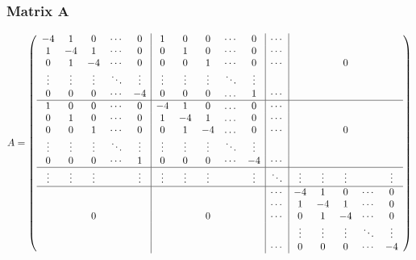 \begin{frame}
\frametitle{Matrix A}

\tiny
\[
	A=\left(
	\begin{array}{ccccc|ccccc|c|ccccc}
	    -4&     1&     0&\cdots&     0 &     1&     0&     0&\cdots&     0 &\cdots &      &      &      &      &      \\
	     1&    -4&     1&\cdots&     0 &     0&     1&     0&\cdots&     0 &\cdots &      &      &      &      &      \\
	     0&     1&    -4&\cdots&     0 &     0&     0&     1&\cdots&     0 &\cdots &      &      &     0&      &      \\
	\vdots&\vdots&\vdots&\ddots&\vdots &\vdots&\vdots&\vdots&\ddots&\vdots &       &      &      &      &      &      \\
	     0&     0&     0&\cdots&    -4 &     0&     0&     0&\dots &     1 &\cdots &      &      &      &      &      \\
	\hline
	     1&     0&     0&\cdots&     0 &    -4&     1&     0&\dots &     0 &\cdots &      &      &      &      &      \\
	     0&     1&     0&\cdots&     0 &     1&    -4&     1&\dots &     0 &\cdots &      &      &      &      &      \\
	     0&     0&     1&\cdots&     0 &     0&     1&    -4&\dots &     0 &\cdots &      &      &     0&      &      \\
	\vdots&\vdots&\vdots&\ddots&\vdots &\vdots&\vdots&\vdots&\ddots&\vdots &       &      &      &      &      &      \\
	     0&     0&     0&\cdots&     1 &     0&     0&     0&\cdots&    -4 &\cdots &      &      &      &      &      \\
	\hline
	\vdots&\vdots&\vdots&      &\vdots &\vdots&\vdots&\vdots&      &\vdots &\ddots &\vdots&\vdots&\vdots&      &\vdots\\
	\hline
	      &      &      &      &       &      &      &      &      &       &\cdots &    -4&     1&     0&\cdots&     0\\
	      &      &      &      &       &      &      &      &      &       &\cdots &     1&    -4&     1&\cdots&     0\\
	      &      &     0&      &       &      &      &     0&      &       &\cdots &     0&     1&    -4&\cdots&     0\\
	      &      &      &      &       &      &      &      &      &       &       &\vdots&\vdots&\vdots&\ddots&\vdots\\
	      &      &      &      &       &      &      &      &      &       &\cdots &     0&     0&     0&\cdots&    -4\\
	\end{array}
	\right) 
	\]

\end{frame}


